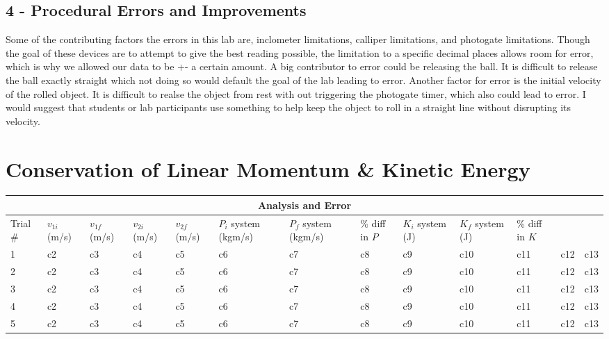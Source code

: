\documentclass{report}
\begin{document}
\section*{4 - Procedural Errors and Improvements}

Some of the contributing factors the errors in this lab are, inclometer limitations, calliper limitations,
and photogate limitations. Though the goal of these devices are to attempt to give the best reading possible,
the limitation to a specific decimal places allows room for error, which is why we allowed our data to be +-
a certain amount. A big contributor to error could be releasing the ball. It is difficult to release the ball exactly 
straight which not doing so would default the goal of the lab leading to error. Another factor for error is the 
initial velocity of the rolled object. It is difficult to realse the object from rest with out triggering 
the photogate timer, which also could lead to error. I would suggest that students or lab participants use something
to help keep the object to roll in a straight line without disrupting its velocity.

\chapter{Conservation of Linear Momentum \& Kinetic Energy}

\begin{center}
  \begin{tabular} { |p{0.75cm}|p{1.4cm}|p{1.45cm}|p{1.4cm}|p{1.45cm}|p{2cm}|p{2cm}|p{2cm}|p{2cm}|p{2cm}|p{2cm}|p{2cm}|p{2cm}| }
    \hline
    \multicolumn{13}{|c|}{ Analysis and Error } \\
    \hline 
    \centering Trial \# & $v_{1i}$ (m/s) & $v_{1f}$ (m/s) & $v_{2i}$ (m/s) & $v_{2f}$ (m/s) & $P_{i}$ system (kgm/s)& $P_{f}$ system (kgm/s) & \% diff in $P$ & $K_{i}$ system (J) & $K_{f}$ system (J) & \% diff in $K$ \\ 
    \hline
    1 & c2 & c3 & c4 & c5 & c6 & c7 & c8 & c9 & c10 & c11 & c12 & c13 \\
    2 & c2 & c3 & c4 & c5 & c6 & c7 & c8 & c9 & c10 & c11 & c12 & c13 \\
    3 & c2 & c3 & c4 & c5 & c6 & c7 & c8 & c9 & c10 & c11 & c12 & c13 \\
    4 & c2 & c3 & c4 & c5 & c6 & c7 & c8 & c9 & c10 & c11 & c12 & c13 \\
    5 & c2 & c3 & c4 & c5 & c6 & c7 & c8 & c9 & c10 & c11 & c12 & c13 \\
    \hline
  \end{tabular}
\end{center}
\end{document}
